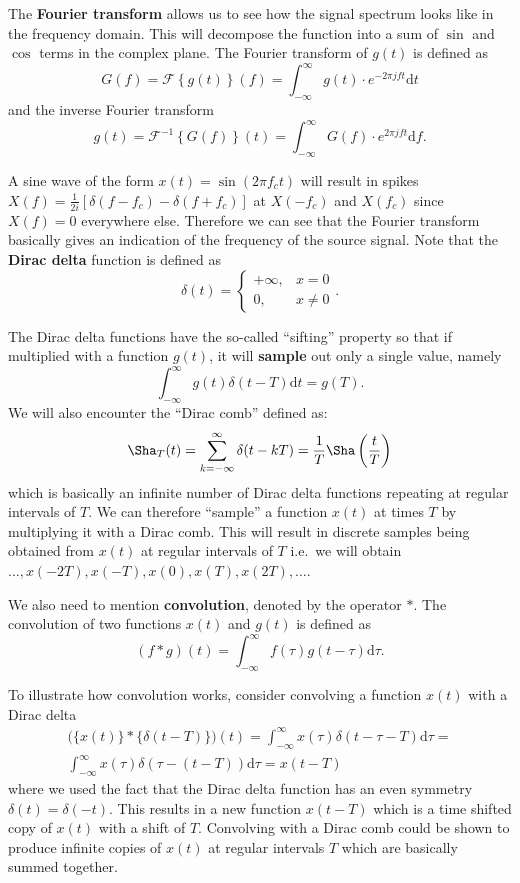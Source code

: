 \documentclass[a4paper,12pt,twoside,openright]{report}
\begin{document}
The \textbf{Fourier transform} \cite{briggs1995dft} allows us to see how the signal spectrum looks like in the frequency domain. This will decompose the function into a sum of $\sin$ and $\cos$ terms in the complex plane. The Fourier transform of $g(t)$ is defined as
$$G(f)=\mathcal{F} \left\{ g(t) \right\} (f) = \int_{-\infty}^{\infty} g(t) \cdot e^{- 2 \pi j f t} \text{d} t $$
and the inverse Fourier transform
$$g(t) = \mathcal{F}^{-1} \left\{ G(f) \right\} (t) = \int_{-\infty}^{\infty} G(f) \cdot e^{2 \pi j f t} \text{d} f.$$

A sine wave of the form $x(t) = \sin(2 \pi f_{c} t)$ will result in spikes $X(f) = \frac{1}{2 i} [\delta(f - f_{c}) - \delta(f
 + f_{c})]$ at $X(-f_{c})$ and $X(f_{c})$ since $X(f) = 0$ everywhere else. Therefore we can see that the Fourier transform basically gives an indication of the frequency of the source signal. Note that the \textbf{Dirac delta} function is defined as
$$ \delta(t) = \begin{cases} +\infty, & x = 0 \\ 0, & x \neq 0 \end{cases}.$$

The Dirac delta functions have the so-called ``sifting'' property so that if multiplied with a function $g(t)$, it will \textbf{sample} out only a single value, namely
$$ \int_{-\infty}^{\infty} g(t) \delta(t - T) \text{d} t = g(T) .$$
We will also encounter the ``Dirac comb'' defined as:
$$ \Sha_{T}(t) = \sum_{k=-\infty}^{\infty} \delta(t - kT) = \frac{1}{T} \Sha \left( \frac{t}{T} \right) $$
which is basically an infinite number of Dirac delta functions repeating at regular intervals of $T$. We can therefore ``sample'' a function $x(t)$ at times $T$ by multiplying it with a Dirac comb. This will result in discrete samples being obtained from $x(t)$ at regular intervals of $T$ i.e.\  we will obtain $\dots, x(-2 T), x(-T), x(0), x(T), x(2 T), \dots$.

We also need to mention \textbf{convolution}, denoted by the operator $\ast$. The convolution of two functions $x(t)$ and $g(t)$ is defined as
$$(f \ast g)(t) = \int_{-\infty}^{\infty} f(\tau) g(t - \tau) \text{d} \tau .$$

To illustrate how convolution works, consider convolving a function $x(t)$ with a Dirac delta
\begin{multline}
\big( \{ x(t) \} \ast \{ \delta(t-T) \} \big)(t) =  \int_{-\infty}^{\infty} x(\tau) \delta(t - \tau - T ) \text{d} \tau = \\
\int_{-\infty}^{\infty} x(\tau) \delta( \tau - ( t -T) ) \text{d} \tau = x(t-T)
\end{multline}
where we used the fact that the Dirac delta function has an even symmetry $\delta(t) = \delta(-t)$. This results in a new function $x(t-T)$ which is a time shifted copy of $x(t)$ with a shift of $T$. Convolving with a Dirac comb could be shown to produce infinite copies of $x(t)$ at regular intervals $T$ which are basically summed together.
\end{document}
